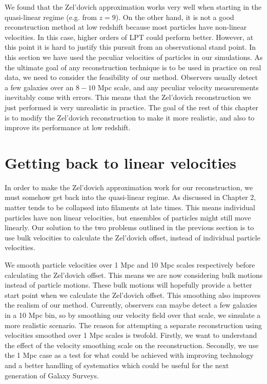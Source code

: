 We found that the Zel'dovich approximation works very well when starting in the quasi-linear regime (e.g. from $z=9$). On the other hand, it is not a good reconstruction method at low redshift because most particles have non-linear velocities. In this case, higher orders of LPT could perform better. However, at this point it is hard to justify this pursuit from an observational stand point. In this section we have used the peculiar velocities of particles in our simulations. As the ultimate goal of any reconstruction technique is to be used in practice on real data, we need to consider the feasibility of our method. Observers usually detect a few galaxies over an $8-10$ Mpc scale, and any peculiar velocity measurements inevitably come with errors. This means that the Zel'dovich reconstruction we just performed is very unrealistic in practice. The goal of the rest of this chapter is to modify the Zel'dovich reconstruction to make it more realistic, and also to improve its performance at low redshift.

\section{Getting back to linear velocities}

In order to make the Zel'dovich approximation work for our reconstruction, we must somehow get back into the quasi-linear regime. As discussed in Chapter 2, matter tends to be collapsed into filaments at late times. This means individual particles have non linear velocities, but ensembles of particles might still move linearly. Our solution to the two problems outlined in the previous section is to use bulk velocities to calculate the Zel'dovich offset, instead of individual particle velocities.

We smooth particle velocities over 1 Mpc and 10 Mpc scales respectively before calculating the Zel'dovich offset. This means we are now considering bulk motions instead of particle motions. These bulk motions will hopefully provide a better start point when we calculate the Zel'dovich offset. This smoothing also improves the realism of our method. Currently, observers can maybe detect a few galaxies in a 10 Mpc bin, so by smoothing our velocity field over that scale, we simulate a more realistic scenario. The reason for attempting a separate reconstruction using velocities smoothed over 1 Mpc scales is twofold. Firstly, we want to understand the effect of the velocity smoothing scale on the reconstruction. Secondly, we use the 1 Mpc case as a test for what could be achieved with improving technology and a better handling of systematics which could be useful for the next generation of Galaxy Surveys.

